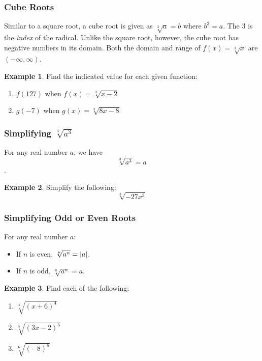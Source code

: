 \documentclass[addpoints,12pt]{exam}
\theoremstyle{definition}
\newtheorem{example}{Example}[subsection]
\begin{document}
\subsubsection*{Cube Roots}
Similar to a square root, a cube root is given as $\sqrt[3]{a} = b$ where $b^3 = a$. The $3$ is the \emph{index} of the radical. Unlike the square root, however, the cube root has negative numbers in its domain. Both the domain and range of $f(x) = \sqrt[3]{x}$ are $(-\infty,\infty)$.

\begin{example}
Find the indicated value for each given function:
\begin{enumerate}
\item $f(127)$ when $f(x) = \sqrt[3]{x-2}$
\vspace{1.5in}
\newpage
\item $g(-7)$ when $g(x) = \sqrt[3]{8x-8}$
\vspace{1.5in}
\end{enumerate}
\end{example}

\subsubsection*{Simplifying $\sqrt[3]{a^3}$}
For any real number $a$, we have \[\sqrt[3]{a^3} = a\].

\begin{example}
Simplify the following: \[\sqrt[3]{-27x^3}\]
\end{example}


\subsubsection*{Simplifying Odd or Even Roots}

For any real number $a$:
\begin{itemize}
\item If $n$ is even, $\sqrt[n]{a^n} = \abs{a}$.
\item If $n$ is odd, $\sqrt[n]{a^n} = a$.
\end{itemize}

\begin{example}
Find each of the following:
\begin{enumerate}
\item $\sqrt[4]{(x+6)^4}$
\vspace{1.5in}

\newpage
\item $\sqrt[5]{(3x-2)^5}$
\vspace{1.5in}
\item $\sqrt[6]{(-8)^6}$
\vspace{1.5in}
\end{enumerate}
\end{example}
\end{document}
